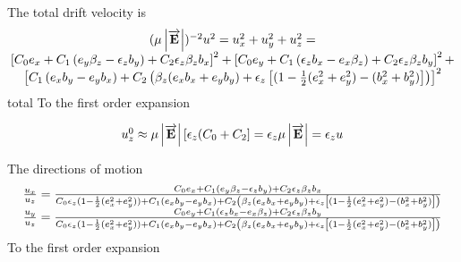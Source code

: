 \documentclass[12pt]{article} %
\begin{document}
The total drift velocity is 
\begin{equation}
\begin{matrix}
(\mu \left| \overrightarrow{ \mathbf{E} }\right|)^{-2} u^2 = u_{x}^2 + u_{y}^2 +u_{z}^2 = \cr
\left[ C_{0} e_{x}
 + C_{1} \left( e_{y} \beta_{z}  - \epsilon_{z}  b_{y}\right)
 + C_{2} \epsilon_{z}  \beta_{z} b_{x}
\right]^2
+
\left[ C_{0} e_{y} 
 + C_{1} \left(  \epsilon_{z} b_{x} - e_{x} \beta_{z} \right)
 + C_{2} \epsilon_{z}  \beta_{z} b_{y} 
\right]^{2} 
+ \cr
\left[
C_{1} 
\left(
e_{x} b_{y} - e_{y} b_{x} 
\right) 
+ C_{2} 
\left( 
\beta_{z} (e_{x} b_{x} + e_{y} b_{y}) + \epsilon_{z} \left[ (1  - \frac{1}{2}(e_{x}^2 + e_{y}^2) - ( b_{x}^2 + b_{y}^2) \right]
\right)
\right]^2
\end{matrix}
\end{equation}
total
To the first order expansion

\begin{equation}  %
\begin{matrix}
u_{z}^{0} \approx
\mu \left| \overrightarrow{ \mathbf{E} }\right| 
\left[ 
  \epsilon_{z} ( C_{0} + C_{2}
\right]
= \epsilon_{z} \mu \left| \overrightarrow{ \mathbf{E} }\right| = \epsilon_{z} u
\cr
\end{matrix}
\end{equation}


The directions of motion 
\begin{equation}
\begin{matrix}
\frac{u_{x}}{u_{z}} = 
\frac{C_{0} e_{x}
    + C_{1} \left( e_{y} \beta_{z}  - \epsilon_{z}  b_{y}\right)
    + C_{2} \epsilon_{z}  \beta_{z} b_{x}
}{
C_{0} \epsilon_{z}  (1 - \frac{1}{2}( e_{x}^2 + e_{y}^2)) +
C_{1} \left( e_{x} b_{y} - e_{y} b_{x} \right) 
+ C_{2} 
\left( 
\beta_{z} (e_{x} b_{x} + e_{y} b_{y}) + \epsilon_{z} \left[ (1  - \frac{1}{2}(e_{x}^2 + e_{y}^2) - ( b_{x}^2 + b_{y}^2) \right]
\right)
} \cr
\frac{u_{y}}{u_{z}} = 
\frac{
   C_{0} e_{y} 
 + C_{1} \left(  \epsilon_{z} b_{x} - e_{x} \beta_{z} \right)
 + C_{2} \epsilon_{z}  \beta_{z} b_{y} 
}{
C_{0} \epsilon_{z}  (1 - \frac{1}{2}( e_{x}^2 + e_{y}^2)) +
C_{1} \left( e_{x} b_{y} - e_{y} b_{x} \right) 
+ C_{2} 
\left( 
\beta_{z} (e_{x} b_{x} + e_{y} b_{y}) + \epsilon_{z} \left[ (1  - \frac{1}{2}(e_{x}^2 + e_{y}^2) - ( b_{x}^2 + b_{y}^2) \right]
\right)
}
\end{matrix}
\end{equation}
To the first order expansion
\end{document}
